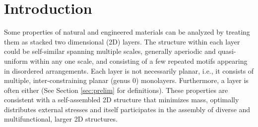 \section{Introduction}
\label{sec:intro}


Some properties of natural and engineered materials can be analyzed by
treating them as stacked two dimensional (2D) layers. The structure
within each layer could be self-similar \cite{Intro1} spanning
multiple scales, generally aperiodic and quasi-uniform within any one
scale, and consisting of a few repeated motifs appearing in disordered
arrangements. Each layer is not necessarily planar, i.e., it consists
of multiple, inter-constraining planar (genus 0) monolayers.
Furthermore, a layer is often  either  (See Section \ref{sec:prelim} for
definitions). These properties are consistent with a self-assembled 2D
structure that minimizes mass, optimally distributes external stresses
and itself participates in the assembly of diverse and
multifunctional, larger 2D structures.

